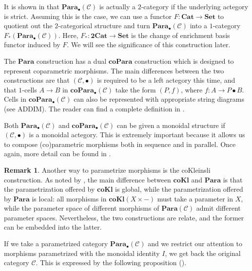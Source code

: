 \documentclass[12pt,a4paper,openright,twoside]{report}
\theoremstyle{plain}
\theoremstyle{definition}
\newtheorem{remark}[proposition]{Remark}
\begin{document}
It is shown in \cite{gavranovic2024fundamental} that $\mathbf{Para}_{\bullet}(\mathcal{C})$ is actually a $2$-category if the underlying actegory is strict. Assuming this is the case, we can use a functor $F: \mathbf{Cat} \to \mathbf{Set}$ to quotient out the $2$-categorical structure and turn $\mathbf{Para}_{\bullet}(\mathcal{C})$ into a $1$-category $F_{*}(\mathbf{Para}_{\bullet}(\mathcal{C}))$. Here, $F_{*}: \mathbf{2Cat} \to \mathbf{Set}$ is the change of enrichment basis functor induced by $F$. We will see the significance of this construction later.


The $\mathbf{Para}$ construction has a dual $\mathbf{coPara}$ construction which is designed to represent coparametric morphisms. The main differences between the two constructions are that $(\mathcal{C}, \bullet)$ is required to be a left actegory this time, and that $1$-cells $A \to B$ in $\mathbf{coPara}_{\bullet}(\mathcal{C})$ take the form $(P,f)$, where $f: A \to P \bullet B$.
Cells in $\mathbf{coPara}_{\bullet}(\mathcal{C})$ can also be represented with appropriate string diagrams (see ADDIM). The reader can find a complete definition in \cite{gavranovic2024fundamental}.


Both $\mathbf{Para}_{\bullet}(\mathcal{C})$ and $\mathbf{coPara}_{\bullet}(\mathcal{C})$ can be given a monoidal structure if $(\mathcal{C}, \bullet)$ is a monoidal actegory. This is extremely important because it allows us to compose (co)parametric morphisms both in sequence and in parallel. Once again, more detail can be found in \cite{gavranovic2024fundamental}.


\begin{remark}
  Another way to parametrize morphisms is the coKleinsli construction. As noted by \cite{gavranovic2024fundamental}, the main difference between $\mathbf{coKl}$ and $\mathbf{Para}$ is that the parametrization offered by $\mathbf{coKl}$ is global, while the parametrization offered by $\mathbf{Para}$ is local: all morphisms in $\mathbf{coKl}(X \times -)$ must take a parameter in $X$, while the parameter space of different morphisms of $\mathbf{Para}(\mathcal{C})$ admit different parameter spaces. Nevertheless, the two constructions are relate, and the former can be embedded into the latter.
\end{remark}


If we take a parametrized category $\mathbf{Para}_\bullet(\mathcal{C})$ and we restrict our attention to morphisms parametrized with the monoidal identity $I$, we get back the original category $\mathcal{C}$. This is expressed by the following proposition (\cite{gavranovic2024fundamental}).
\end{document}
